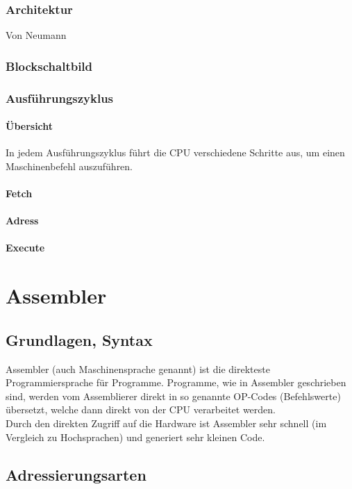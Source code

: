 \documentclass{report}
\begin{document}
\subsection{Architektur}
Von Neumann

\subsection{Blockschaltbild}

\subsection{Ausführungszyklus}
\subsubsection{Übersicht}
In jedem Ausführungszyklus führt die CPU verschiedene Schritte aus, um einen Maschinenbefehl auszuführen. 
\subsubsection{Fetch}
\subsubsection{Adress}
\subsubsection{Execute}

\chapter{Assembler}
\section{Grundlagen, Syntax}
Assembler (auch Maschinensprache genannt) ist die direkteste Programmiersprache für Programme. Programme, wie in Assembler geschrieben sind, werden vom Assemblierer direkt in so genannte OP-Codes (Befehlswerte) übersetzt, welche dann direkt von der CPU verarbeitet werden.\\

Durch den direkten Zugriff auf die Hardware ist Assembler sehr schnell (im Vergleich zu Hochsprachen) und generiert sehr kleinen Code.


\section{Adressierungsarten}
\end{document}
